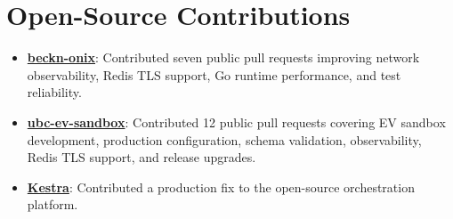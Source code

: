 \section{Open-Source Contributions}
\begin{itemize}
  \item \href{https://github.com/beckn/beckn-onix}{\textbf{beckn-onix}}: Contributed seven public pull requests improving network observability, Redis TLS support, Go runtime performance, and test reliability.
  \item \href{https://github.com/bhim/ubc-ev-sandbox}{\textbf{ubc-ev-sandbox}}: Contributed 12 public pull requests covering EV sandbox development, production configuration, schema validation, observability, Redis TLS support, and release upgrades.
  \item \href{https://github.com/kestra-io/kestra/pull/15047}{\textbf{Kestra}}: Contributed a production fix to the open-source orchestration platform.
\end{itemize}

